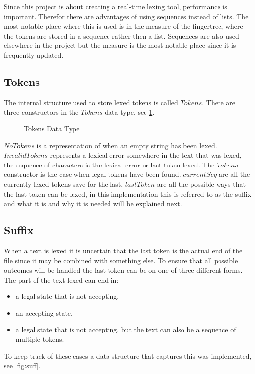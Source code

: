 Since this project is about creating a real-time lexing tool, performance is
important. Therefor there are advantages of using sequences instead of lists.
The most notable place where this is used is in the measure of the fingertree,
where the tokens are stored in a sequence rather then a list. Sequences are also
used elsewhere in the project but the measure is the most notable place since it is
frequently updated.

\subsection{Tokens}
The internal structure used to store lexed tokens is called $Tokens$. There are
three constructors in the $Tokens$ data type, see \cref{fig:tokens}.

\begin{figure}[h!]
  
  \caption{Tokens Data Type\label{fig:tokens}}
\end{figure}

$NoTokens$ is a representation of when an empty string has been lexed.
$InvalidTokens$ represents a lexical error somewhere in the text that was lexed,
the sequence of characters is the lexical error or last token lexed. The
$Tokens$ constructor is the case when legal tokens have been found. $currentSeq$
are all the currently lexed tokens save for the last, $lastToken$ are all the
possible ways that the last token can be lexed, in this implementation this is
referred to as the suffix and what it is and why it is needed will be explained
next.

\subsection{Suffix}\label{sub:suff}
When a text is lexed it is uncertain that the last token is the actual end of
the file since it may be combined with something else. To ensure that all
possible outcomes will be handled the last token can be on one of three
different forms. The part of the text lexed can end in:
\begin{itemize}
\item a legal state that is not accepting.
\item an accepting state.
\item a legal state that is not accepting, but the text can also be a sequence
  of multiple tokens.
\end{itemize}
To keep track of these cases a data structure that captures this was
implemented, see \cref{fig:suff}.

